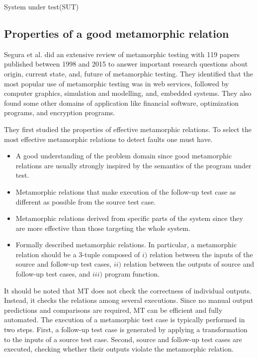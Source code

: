 System under test(SUT)

\subsection{Properties of a good metamorphic relation}
Segura et al. did an extensive review of metamorphic testing with 119 papers published between 1998 and 2015 to answer important research questions about origin, current state, and, future of metamorphic testing. They identified that the most popular use of metamorphic testing was in web services, followed by computer graphics, simulation and modelling, and, embedded systems. They also found some other domains of application like financial software, optimization programs, and encryption programs.
 
They first studied the properties of effective metamorphic relations. To select the most effective metamorphic relations to detect faults one must have.
\begin{itemize}
	\item A good understanding of the problem domain since good metamorphic relations are usually strongly inspired by the semantics of the program under test.
	\item Metamorphic relations that make execution of the follow-up test case as different as possible from the source test case.
	\item Metamorphic relations derived from specific parts of the system since they are more effective than those targeting the whole system.
	\item Formally described metamorphic relations. In particular, a metamorphic relation should be a 3-tuple composed of $i)$ relation between the inputs of the source and follow-up test cases, $ii)$ relation between the outputs of source and follow-up test cases, and $iii)$ program function.
\end{itemize}
			





It should be noted that MT does not check the correctness of individual outputs. Instead, it checks the relations among several executions. Since no manual output predictions and comparisons are required, MT can be efficient and fully automated. \cite{Segura2016} The execution of a metamorphic test case is typically performed in two steps. First, a follow-up test case is generated by applying a transformation to the inputs of a source test case. Second, source and follow-up test cases are executed, checking whether their outputs violate the metamorphic relation. \par

